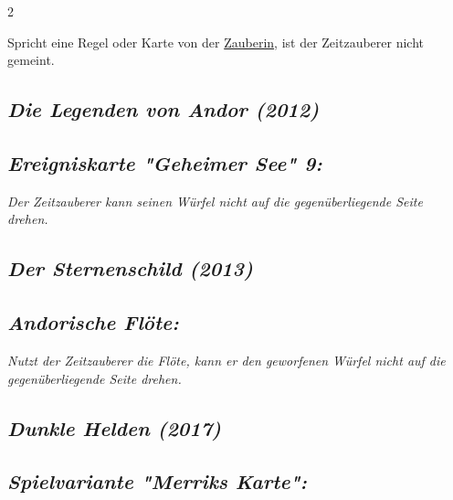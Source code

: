 \documentclass[10pt, a4paper, oneside]{book}
\newcommand{\fan}[1]{\textit{#1}}
\begin{document}
\begin{multicols*}{2}
\begin{nobgcolor}
Spricht eine Regel oder Karte von der \hyperref[Zauberin]{Zauberin}, ist der Zeitzauberer nicht gemeint.

\end{nobgcolor}



\begin{bgcolor}

\section{\fan{Die Legenden von Andor (2012)}}

\subsection{\fan{Ereigniskarte "Geheimer See" 9:}}

\fan{Der Zeitzauberer kann seinen Würfel nicht auf die gegenüberliegende Seite drehen.}


\end{bgcolor}





\begin{bgcolor}
\section{\fan{Der Sternenschild (2013)}}


\subsection{\fan{Andorische Flöte:}}

\fan{Nutzt der Zeitzauberer die Flöte, kann er den geworfenen Würfel nicht auf die gegenüberliegende Seite drehen.}

\end{bgcolor}




\begin{nobgcolor}

\section{\fan{Dunkle Helden (2017)}}

\subsection{\fan{Spielvariante "Merriks Karte":}}


\end{nobgcolor}
\end{multicols*}
\end{document}
